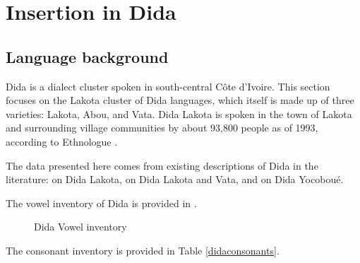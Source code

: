 \documentclass[output=paper,colorlinks,citecolor=brown]{langscibook}
\begin{document}
\section{Insertion in Dida}\label{sec:dida}
\subsection{Language background}
Dida is a dialect cluster spoken in south-central Côte d'Ivoire. This section focuses on the Lakota cluster of Dida languages, which itself is made up of three varieties: Lakota, Abou, and Vata. Dida Lakota is spoken in the town of Lakota and surrounding village communities by about 93,800 people as of 1993, according to Ethnologue \citep{Ethnologue20}.

The data presented here comes from existing descriptions of Dida in the literature: \citet{Guehoun:1993} on Dida Lakota, \citet{Vogler:1976,Kaye:1981,Kaye&Charette,Kaye:1982} on Dida Lakota and Vata, and \citet{Masson:1992} on Dida Yocoboué.

The vowel inventory of Dida is provided in .

\begin{figure}
\caption{Dida Vowel inventory}
\begin{center}
		\begin{vowel}
		\end{vowel}
	\end{center}
\label{didavowels}
\end{figure}


The consonant inventory is provided in Table \ref{didaconsonants}.
\end{document}
